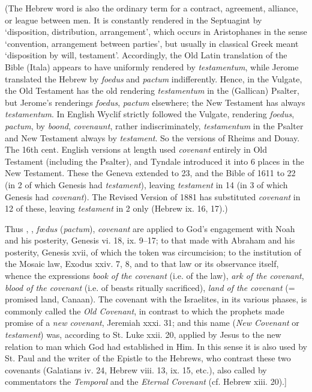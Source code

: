 \begin{compactitem}
\begin{compactitem}
					\item (The Hebrew word \hyperref[BERIT]{} is also the ordinary term for a contract, agreement, alliance, or league between men. It is constantly rendered in the Septuagint by \hyperref[DIATHEKE]{} `disposition, distribution, arrangement', which occurs in Aristophanes in the sense `convention, arrangement between parties', but usually in classical Greek meant `disposition by will, testament'. Accordingly, the Old Latin translation of the Bible (Itala) appears to have uniformly rendered \hyperref[DIATHEKE]{} by \textit{testamentum}, while Jerome translated the Hebrew by \textit{foedus} and \textit{pactum} indifferently. Hence, in the Vulgate, the Old Testament has the old rendering \textit{testamentum} in the (Gallican) Psalter, but Jerome's renderings \textit{foedus}, \textit{pactum} elsewhere; the New Testament has always \textit{testamentum}. In English Wyclif strictly followed the Vulgate, rendering \textit{foedus}, \textit{pactum}, by \textit{boond}, \textit{covenaunt}, rather indiscriminately, \textit{testamentum} in the Psalter and New Testament always by \textit{testament}. So the versions of Rheims and Douay. The 16th cent. English versions at length used \textit{covenant} entirely in Old Testament (including the Psalter), and Tyndale introduced it into 6 places in the New Testament. These the Geneva extended to 23, and the Bible of 1611 to 22 (in 2 of which Genesis had \textit{testament}), leaving \textit{testament} in 14 (in 3 of which Genesis had \textit{covenant}). The Revised Version of 1881 has substituted \textit{covenant} in 12 of these, leaving \textit{testament} in 2 only (Hebrew ix. 16, 17).)
					\item Thus \hyperref[BERIT]{}, \hyperref[DIATHEKE]{}, \textit{fœdus} (\textit{pactum}), \textit{covenant} are applied to God's engagement with Noah and his posterity, Genesis vi. 18, ix. 9–17; to that made with Abraham and his posterity, Genesis xvii, of which the token was circumcision; to the institution of the Mosaic law, Exodus xxiv. 7, 8, and to that law or its observance itself, whence the expressions \textit{book of the covenant} (i.e. of the law), \textit{ark of the covenant}, \textit{blood of the covenant} (i.e. of beasts ritually sacrificed), \textit{land of the covenant} (= promised land, Canaan). The covenant with the Israelites, in its various phases, is commonly called the \textit{Old Covenant}, in contrast to which the prophets made promise of a \textit{new covenant}, Jeremiah xxxi. 31; and this name  \hyperref[DIATHEKE]{} (\textit{New Covenant} or \textit{testament}) was, according to St. Luke xxii. 20, applied by Jesus to the new relation to man which God had established in Him. In this sense it is also used by St. Paul and the writer of the Epistle to the Hebrews, who contrast these two covenants (Galatians iv. 24, Hebrew viii. 13, ix. 15, etc.), also called by commentators the \textit{Temporal} and the \textit{Eternal Covenant} (cf. Hebrew xiii. 20).]

\end{compactitem}
\end{compactitem}
